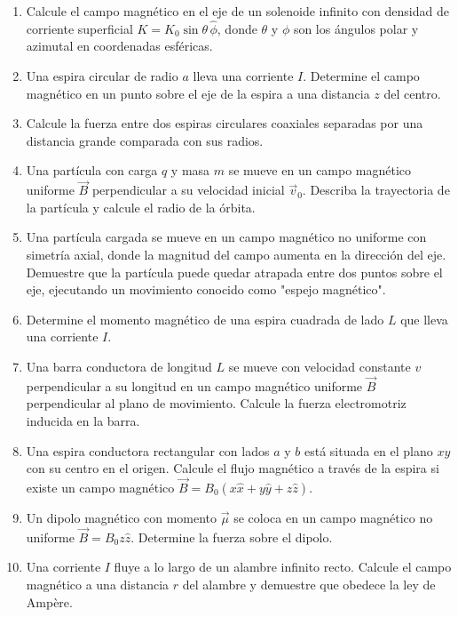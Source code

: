 \documentclass[12pt,a4paper]{book}
\begin{document}
\begin{enumerate}
\item Calcule el campo magnético en el eje de un solenoide infinito con densidad de corriente superficial $K = K_0 \sin\theta \, \hat{\phi}$, donde $\theta$ y $\phi$ son los ángulos polar y azimutal en coordenadas esféricas.

\item Una espira circular de radio $a$ lleva una corriente $I$. Determine el campo magnético en un punto sobre el eje de la espira a una distancia $z$ del centro.

\item Calcule la fuerza entre dos espiras circulares coaxiales separadas por una distancia grande comparada con sus radios.

\item Una partícula con carga $q$ y masa $m$ se mueve en un campo magnético uniforme $\vec{B}$ perpendicular a su velocidad inicial $\vec{v}_0$. Describa la trayectoria de la partícula y calcule el radio de la órbita.

\item Una partícula cargada se mueve en un campo magnético no uniforme con simetría axial, donde la magnitud del campo aumenta en la dirección del eje. Demuestre que la partícula puede quedar atrapada entre dos puntos sobre el eje, ejecutando un movimiento conocido como "espejo magnético".

\item Determine el momento magnético de una espira cuadrada de lado $L$ que lleva una corriente $I$.

\item Una barra conductora de longitud $L$ se mueve con velocidad constante $v$ perpendicular a su longitud en un campo magnético uniforme $\vec{B}$ perpendicular al plano de movimiento. Calcule la fuerza electromotriz inducida en la barra.

\item Una espira conductora rectangular con lados $a$ y $b$ está situada en el plano $xy$ con su centro en el origen. Calcule el flujo magnético a través de la espira si existe un campo magnético $\vec{B} = B_0 (x\hat{x} + y\hat{y} + z\hat{z})$.

\item Un dipolo magnético con momento $\vec{\mu}$ se coloca en un campo magnético no uniforme $\vec{B} = B_0 z \hat{z}$. Determine la fuerza sobre el dipolo.

\item Una corriente $I$ fluye a lo largo de un alambre infinito recto. Calcule el campo magnético a una distancia $r$ del alambre y demuestre que obedece la ley de Ampère.


\end{enumerate}
\end{document}

